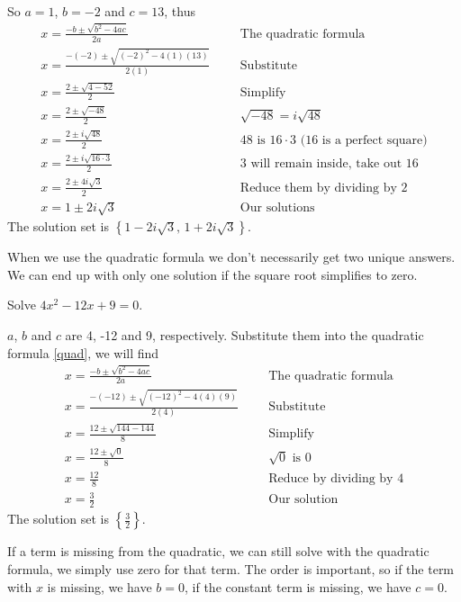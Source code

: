 %
So $a=1$, $b=-2$ and $c=13$, thus
	\begin{align*}
		x =\frac{-b \pm \sqrt{b^2-4ac}}{2a}&   &&\text{The quadratic formula}\\
		x =\frac{-(-2) \pm \sqrt{(-2)^2-4(1)(13)}}{2(1)}&
		&   &\text{Substitute}\\
		x =\frac{2 \pm \sqrt{4-52}}{2}&   &&\text{Simplify}\\
		x =\frac{2 \pm \sqrt{-48}}{2}& &   
		&\text{$\sqrt{-48}=i\sqrt{48}$}\\
		x =\frac{2 \pm i\sqrt{48}}{2}& &   
		&\text{48 is $16\cdot 3$ (16 is a perfect square)}\\
		x =\frac{2 \pm i\sqrt{16\cdot 3}}{2}& &&\text{3 will remain inside, take out 16} \\
	    x =\frac{2 \pm 4i\sqrt{3}}{2}& &&\text{Reduce them by dividing by 2} \\
	    x =1 \pm 2i\sqrt{3}& &&\text{Our solutions}
	\end{align*}
The solution set is $\left\{1 -2i\sqrt{3},\,1+ 2i\sqrt{3}\right\}$.
\vspace{0.4cm}
\begin{nt}
When we use the quadratic formula we don’t necessarily get two unique answers.
We can end up with only one solution if the square root simplifies to zero.	
\end{nt}
\vspace{0.4cm}
\begin{exa}
Solve $4x^2-12x+9=0$.
\end{exa}
$a$, $b$ and  $c$ are 4, -12 and 9, respectively. Substitute them into the quadratic formula
\eqref{quad}, we will find
	\begin{align*}
					x =\frac{-b \pm \sqrt{b^2-4ac}}{2a}& &&\text{The quadratic formula}\\
					x =\frac{-(-12) \pm \sqrt{(-12)^2-4(4)(9)}}{2(4)}& &&\text{Substitute}\\
					x =\frac{12 \pm \sqrt{144-144}}{8}& &&\text{Simplify}\\
					x =\frac{12 \pm \sqrt{0}}{8}& &&\text{$\sqrt{0}$ is 0}\\
					x =\frac{12}{8}& &&\text{Reduce by dividing by 4}\\
					x =\frac{3}{2}& &&\text{Our solution}
	\end{align*}
The solution set is $\left\{\frac{3}{2}\right\}$.
\vspace{0.2cm}
\begin{nt}
If a term is missing from the quadratic, we can still solve with the quadratic formula,
we simply use zero for that term. The order is important, so if the term with $x$ is missing, we 
have $b=0$, if the constant term is missing, we have $c = 0$.
\end{nt}
